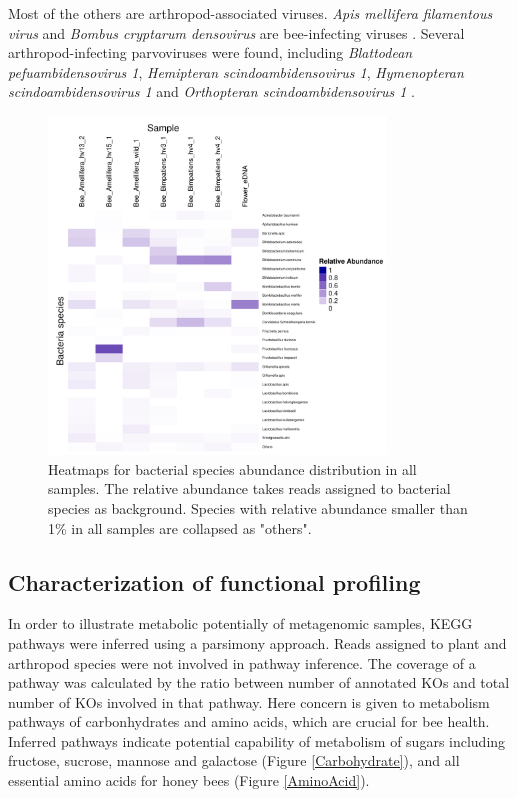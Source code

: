 \documentclass[11pt]{article}
\begin{document}
    Most of the others are arthropod-associated viruses. 
    \textit{Apis mellifera filamentous virus} and \textit{Bombus cryptarum densovirus} are bee-infecting viruses \citep{clark1978filamentous,bailey1981properties,schoonvaere2018study}. 
    Several arthropod-infecting parvoviruses were found, including \textit{Blattodean pefuambidensovirus 1}, \textit{Hemipteran scindoambidensovirus 1}, \textit{Hymenopteran scindoambidensovirus 1} and \textit{Orthopteran scindoambidensovirus 1} \citep{penzes2020reorganizing}.

      \begin{figure}[H]
        \centering
        \includegraphics[width=0.8\textwidth]{../Figures/RelativeAbundance_0_01_species_Bacteria.pdf}
        \caption{Heatmaps for bacterial species abundance distribution in all samples. 
        The relative abundance takes reads assigned to bacterial species as background. 
        Species with relative abundance smaller than 1\% in all samples are collapsed as "others".}
        \label{BacteriaHeatmap}
        \end{figure}

    \subsection{Characterization of functional profiling}
    In order to illustrate metabolic potentially of metagenomic samples, KEGG pathways were inferred using a parsimony approach. 
    Reads assigned to plant and arthropod species were not involved in pathway inference. 
    The coverage of a pathway was calculated by the ratio between number of annotated KOs and total number of KOs involved in that pathway. 
    \newline
    Here concern is given to metabolism pathways of carbonhydrates and amino acids, which are crucial for bee health. 
    Inferred pathways indicate potential capability of metabolism of sugars including fructose, sucrose, mannose and galactose (Figure \ref{Carbohydrate}), and all essential amino acids for honey bees (Figure \ref{AminoAcid})\citep{groot1953protein}. 
\end{document}
